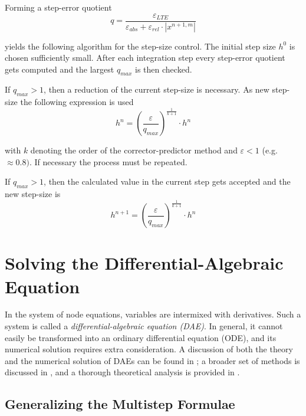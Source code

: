 Forming a step-error quotient
\begin{equation}
q = \dfrac{\varepsilon_{LTE}}{\varepsilon_{abs} + \varepsilon_{rel}\cdot \left|x^{n+1,m}\right|}
\end{equation}

yields the following algorithm for the step-size control.  The initial
step size $h^0$ is chosen sufficiently small.  After each integration
step every step-error quotient gets computed and the largest $q_{max}$
is then checked.

\addvspace{12pt}

If $q_{max} > 1$, then a reduction of the current step-size is
necessary.  As new step-size the following expression is used
\begin{equation}
h^n = \left(\dfrac{\varepsilon}{q_{max}}\right)^{\tfrac{1}{k + 1}}\cdot h^n
\end{equation}

with $k$ denoting the order of the corrector-predictor method and
$\varepsilon < 1$ (e.g. $\approx 0.8)$.  If necessary the process must
be repeated.

\addvspace{12pt}

If $q_{max} > 1$, then the calculated value in the current step gets
accepted and the new step-size is
\begin{equation}
h^{n+1} = \left(\dfrac{\varepsilon}{q_{max}}\right)^{\tfrac{1}{k + 1}}\cdot h^n
\end{equation}

\section{Solving the Differential-Algebraic Equation}

In the system of node equations, variables are intermixed with
derivatives.  Such a system is called a \emph{differential-algebraic
  equation (DAE)}.  In general, it cannot easily be transformed into
an ordinary differential equation (ODE), and its numerical solution
requires extra consideration.  A discussion of both the theory and the
numerical solution of DAEs can be found in
\cite{BrenanCampbellPetzold}; a broader set of methods is discussed in
\cite{HairerWanner}, and a thorough theoretical analysis is provided in
\cite{KunkelMehrmann}.

\subsection{Generalizing the Multistep Formulae}

